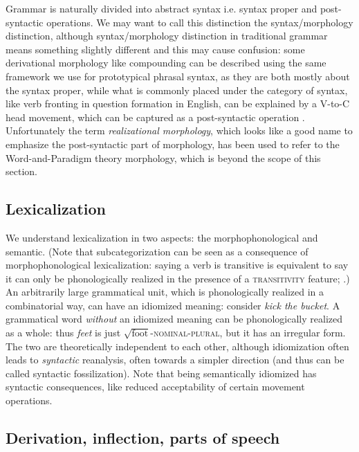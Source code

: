 \documentclass[UTF8, a4paper, oneside, scheme=plain, 12pt]{ctexrep}
\newcommand*{\citepage}[1]{p.~{#1}}
\newcommand*{\term}[1]{\emph{#1}}
\newcommand{\form}[1]{\emph{#1}}
\newcommand*{\category}[1]{\textsc{#1}}
\newcommand*{\wordroot}[1]{$\sqrt{\text{#1}}$}
\begin{document}
{Grammar is naturally divided into abstract syntax i.e. syntax proper and post-syntactic operations.
We may want to call this distinction the syntax/morphology distinction,
although syntax/morphology distinction in traditional grammar means something slightly different and
this may cause confusion: some derivational morphology like compounding can be described using the same framework we use for prototypical phrasal syntax,
as they are both mostly about the syntax proper,
while what is commonly placed under the category of syntax,
like verb fronting in question formation in English,
can be explained by a V-to-C head movement, which can be captured as a post-syntactic operation 
\citep[\citepage{24}]{siddiqi2009syntax}.
Unfortunately the term \term{realizational morphology},
which looks like a good name to emphasize the post-syntactic part of morphology, 
has been used to refer to the Word-and-Paradigm theory morphology,
which is beyond the scope of this section.

\subsection{Lexicalization}\label{sec:intro.theory.lexicon}

We understand lexicalization in two aspects:
the morphophonological and semantic.
(Note that subcategorization can be seen as a consequence of morphophonological lexicalization:
saying a verb is transitive is equivalent to say it can only be phonologically realized
in the presence of a \category{transitivity} feature; \citealt{siddiqi2009syntax}.)
An arbitrarily large grammatical unit,
which is phonologically realized in a combinatorial way, can have an idiomized meaning:
consider \form{kick the bucket}.
A grammatical word \emph{without} an idiomized meaning
can be phonologically realized as a whole:
thus \form{feet} is just \wordroot{foot}-\category{nominal}-\category{plural},
but it has an irregular form.
The two are theoretically independent to each other,
although idiomization often leads to \emph{syntactic} reanalysis,
often towards a simpler direction (and thus can be called syntactic fossilization). 
Note that being semantically idiomized has syntactic consequences,
like reduced acceptability of certain movement operations.

\subsection{Derivation, inflection, parts of speech}\label{sec:intro.theory.pos}

}
\end{document}

